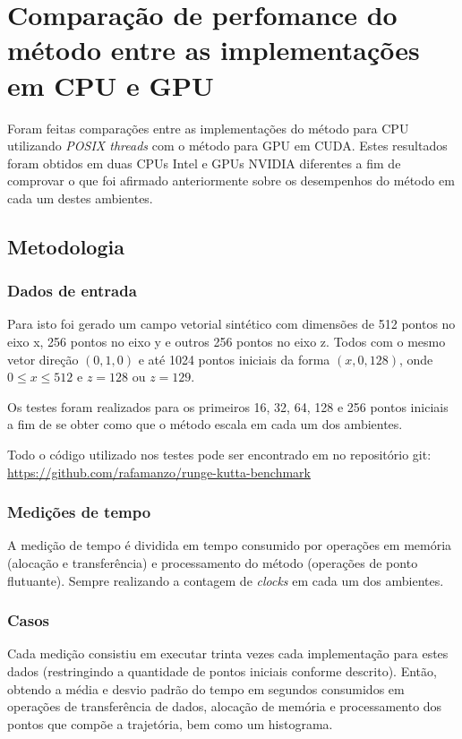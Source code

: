 \section{Comparação de perfomance do método entre as implementações em CPU e GPU}
Foram feitas comparações entre as implementações do método para CPU utilizando \textit{POSIX threads} com o método para GPU em CUDA. Estes resultados foram obtidos em duas CPUs Intel e GPUs NVIDIA diferentes a fim de comprovar o que foi afirmado anteriormente sobre os desempenhos do método em cada um destes ambientes.

  \subsection{Metodologia}
    \subsubsection{Dados de entrada}
    Para isto foi gerado um campo vetorial sintético com dimensões de 512 pontos no eixo x, 256 pontos no eixo y e outros 256 pontos no eixo z. Todos com o mesmo vetor direção $(0, 1, 0)$ e até 1024 pontos iniciais da forma $(x, 0, 128)$, onde $0 \leq x \leq 512$ e $z = 128$ ou $z = 129$.
    
    Os testes foram realizados para os primeiros 16, 32, 64, 128 e 256 pontos iniciais a fim de se obter como que o método escala em cada um dos ambientes.
    
    Todo o código utilizado nos testes pode ser encontrado em no repositório git: \href{https://github.com/rafamanzo/runge-kutta-benchmark}{https://github.com/rafamanzo/runge-kutta-benchmark}
    
    \subsubsection{Medições de tempo}
    A medição de tempo é dividida em tempo consumido por operações em memória (alocação e transferência) e processamento do método (operações de ponto flutuante). Sempre realizando a contagem de \textit{clocks} em cada um dos ambientes.
    
    \subsubsection{Casos}
    Cada medição consistiu em executar trinta vezes cada implementação para estes dados (restringindo a quantidade de pontos iniciais conforme descrito). Então, obtendo a média e desvio padrão do tempo em segundos consumidos em operações de transferência de dados, alocação de memória e processamento dos pontos que compõe a trajetória, bem como um histograma.

